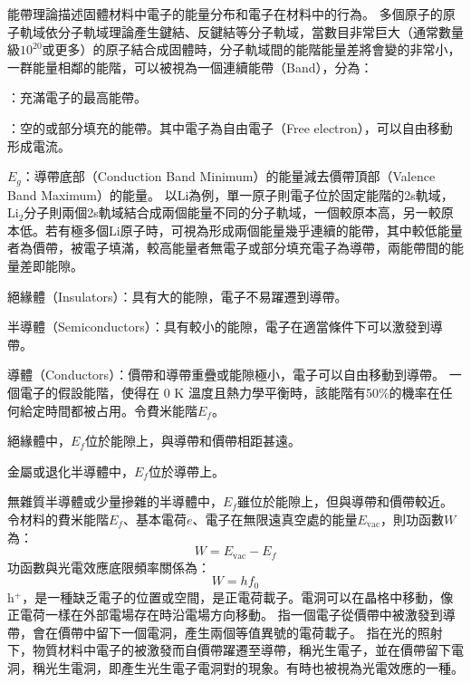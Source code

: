 \documentclass[a4paper,12pt]{report}
\begin{document}
能帶理論描述固體材料中電子的能量分布和電子在材料中的行為。
多個原子的原子軌域依分子軌域理論產生鍵結、反鍵結等分子軌域，當數目非常巨大（通常數量級$10^{20}$或更多）的原子結合成固體時，分子軌域間的能階能量差將會變的非常小，一群能量相鄰的能階，可以被視為一個連續能帶（Band），分為：
\bit
\item{}：充滿電子的最高能帶。
\item{}：空的或部分填充的能帶。其中電子為自由電子（Free electron），可以自由移動形成電流。
\item{}$E_g$：導帶底部（Conduction Band Minimum）的能量減去價帶頂部（Valence Band Maximum）的能量。
\eit
以Li為例，單一原子則電子位於固定能階的2s軌域，Li$_2$分子則兩個2s軌域結合成兩個能量不同的分子軌域，一個較原本高，另一較原本低。若有極多個Li原子時，可視為形成兩個能量幾乎連續的能帶，其中較低能量者為價帶，被電子填滿，較高能量者無電子或部分填充電子為導帶，兩能帶間的能量差即能隙。
\bit
\item 絕緣體（Insulators）：具有大的能隙，電子不易躍遷到導帶。
\item 半導體（Semiconductors）：具有較小的能隙，電子在適當條件下可以激發到導帶。
\item 導體（Conductors）：價帶和導帶重疊或能隙極小，電子可以自由移動到導帶。
\eit
{}
一個電子的假設能階，使得在 0 K 溫度且熱力學平衡時，該能階有50\%的機率在任何給定時間都被占用。令費米能階$E_f$。
\bit
\item 絕緣體中，$E_f$位於能隙上，與導帶和價帶相距甚遠。
\item 金屬或退化半導體中，$E_f$位於導帶上。
\item 無雜質半導體或少量摻雜的半導體中，$E_f$雖位於能隙上，但與導帶和價帶較近。
\eit
{}
令材料的費米能階$E_f$、基本電荷$e$、電子在無限遠真空處的能量$E_{\text{vac}}$，則功函數$W$為：
\[W=E_{\text{vac}}-E_f\]
功函數與光電效應底限頻率關係為：
\[W= h f_0\]
h$^+$，是一種缺乏電子的位置或空間，是正電荷載子。電洞可以在晶格中移動，像正電荷一樣在外部電場存在時沿電場方向移動。
指一個電子從價帶中被激發到導帶，會在價帶中留下一個電洞，產生兩個等值異號的電荷載子。
指在光的照射下，物質材料中電子的被激發而自價帶躍遷至導帶，稱光生電子，並在價帶留下電洞，稱光生電洞，即產生光生電子電洞對的現象。有時也被視為光電效應的一種。
\end{document}
